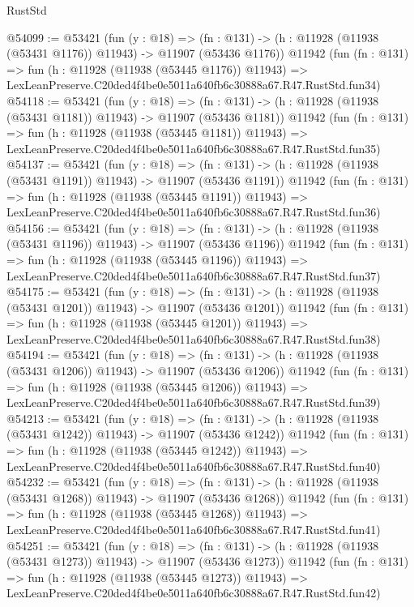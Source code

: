 \begin{lexlean}{RustStd}
\begin{coremodule}
@54099 := @53421
    (fun (y : @18) =>
    (fn : @131) -> (h : @11928 (@11938 (@53431 @1176)) @11943) -> @11907 (@53436 @1176))
    @11942
    (fun (fn : @131) =>
    fun (h : @11928 (@11938 (@53445 @1176)) @11943) =>
    LexLeanPreserve.C20ded4f4be0e5011a640fb6c30888a67.R47.RustStd.fun34)
@54118 := @53421
    (fun (y : @18) =>
    (fn : @131) -> (h : @11928 (@11938 (@53431 @1181)) @11943) -> @11907 (@53436 @1181))
    @11942
    (fun (fn : @131) =>
    fun (h : @11928 (@11938 (@53445 @1181)) @11943) =>
    LexLeanPreserve.C20ded4f4be0e5011a640fb6c30888a67.R47.RustStd.fun35)
@54137 := @53421
    (fun (y : @18) =>
    (fn : @131) -> (h : @11928 (@11938 (@53431 @1191)) @11943) -> @11907 (@53436 @1191))
    @11942
    (fun (fn : @131) =>
    fun (h : @11928 (@11938 (@53445 @1191)) @11943) =>
    LexLeanPreserve.C20ded4f4be0e5011a640fb6c30888a67.R47.RustStd.fun36)
@54156 := @53421
    (fun (y : @18) =>
    (fn : @131) -> (h : @11928 (@11938 (@53431 @1196)) @11943) -> @11907 (@53436 @1196))
    @11942
    (fun (fn : @131) =>
    fun (h : @11928 (@11938 (@53445 @1196)) @11943) =>
    LexLeanPreserve.C20ded4f4be0e5011a640fb6c30888a67.R47.RustStd.fun37)
@54175 := @53421
    (fun (y : @18) =>
    (fn : @131) -> (h : @11928 (@11938 (@53431 @1201)) @11943) -> @11907 (@53436 @1201))
    @11942
    (fun (fn : @131) =>
    fun (h : @11928 (@11938 (@53445 @1201)) @11943) =>
    LexLeanPreserve.C20ded4f4be0e5011a640fb6c30888a67.R47.RustStd.fun38)
@54194 := @53421
    (fun (y : @18) =>
    (fn : @131) -> (h : @11928 (@11938 (@53431 @1206)) @11943) -> @11907 (@53436 @1206))
    @11942
    (fun (fn : @131) =>
    fun (h : @11928 (@11938 (@53445 @1206)) @11943) =>
    LexLeanPreserve.C20ded4f4be0e5011a640fb6c30888a67.R47.RustStd.fun39)
@54213 := @53421
    (fun (y : @18) =>
    (fn : @131) -> (h : @11928 (@11938 (@53431 @1242)) @11943) -> @11907 (@53436 @1242))
    @11942
    (fun (fn : @131) =>
    fun (h : @11928 (@11938 (@53445 @1242)) @11943) =>
    LexLeanPreserve.C20ded4f4be0e5011a640fb6c30888a67.R47.RustStd.fun40)
@54232 := @53421
    (fun (y : @18) =>
    (fn : @131) -> (h : @11928 (@11938 (@53431 @1268)) @11943) -> @11907 (@53436 @1268))
    @11942
    (fun (fn : @131) =>
    fun (h : @11928 (@11938 (@53445 @1268)) @11943) =>
    LexLeanPreserve.C20ded4f4be0e5011a640fb6c30888a67.R47.RustStd.fun41)
@54251 := @53421
    (fun (y : @18) =>
    (fn : @131) -> (h : @11928 (@11938 (@53431 @1273)) @11943) -> @11907 (@53436 @1273))
    @11942
    (fun (fn : @131) =>
    fun (h : @11928 (@11938 (@53445 @1273)) @11943) =>
    LexLeanPreserve.C20ded4f4be0e5011a640fb6c30888a67.R47.RustStd.fun42)

\end{coremodule}
\end{lexlean}
